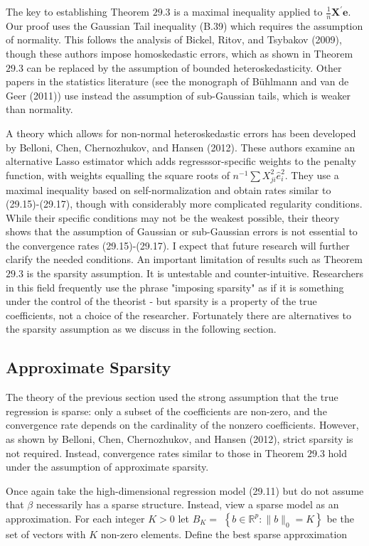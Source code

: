 \documentclass[10pt]{article}
\begin{document}
The key to establishing Theorem $29.3$ is a maximal inequality applied to $\frac{1}{n} \boldsymbol{X}^{\prime} \boldsymbol{e}$. Our proof uses the Gaussian Tail inequality (B.39) which requires the assumption of normality. This follows the analysis of Bickel, Ritov, and Tsybakov (2009), though these authors impose homoskedastic errors, which as shown in Theorem $29.3$ can be replaced by the assumption of bounded heteroskedasticity. Other papers in the statistics literature (see the monograph of Bühlmann and van de Geer (2011)) use instead the assumption of sub-Gaussian tails, which is weaker than normality.

A theory which allows for non-normal heteroskedastic errors has been developed by Belloni, Chen, Chernozhukov, and Hansen (2012). These authors examine an alternative Lasso estimator which adds regresssor-specific weights to the penalty function, with weights equalling the square roots of $n^{-1} \sum X_{j i}^{2} \widehat{e}_{i}^{2}$. They use a maximal inequality based on self-normalization and obtain rates similar to (29.15)-(29.17), though with considerably more complicated regularity conditions. While their specific conditions may not be the weakest possible, their theory shows that the assumption of Gaussian or sub-Gaussian errors is not essential to the convergence rates (29.15)-(29.17). I expect that future research will further clarify the needed conditions. An important limitation of results such as Theorem $29.3$ is the sparsity assumption. It is untestable and counter-intuitive. Researchers in this field frequently use the phrase "imposing sparsity" as if it is something under the control of the theorist - but sparsity is a property of the true coefficients, not a choice of the researcher. Fortunately there are alternatives to the sparsity assumption as we discuss in the following section.

\subsection{Approximate Sparsity}
The theory of the previous section used the strong assumption that the true regression is sparse: only a subset of the coefficients are non-zero, and the convergence rate depends on the cardinality of the nonzero coefficients. However, as shown by Belloni, Chen, Chernozhukov, and Hansen (2012), strict sparsity is not required. Instead, convergence rates similar to those in Theorem $29.3$ hold under the assumption of approximate sparsity.

Once again take the high-dimensional regression model (29.11) but do not assume that $\beta$ necessarily has a sparse structure. Instead, view a sparse model as an approximation. For each integer $K>0$ let $B_{K}=$ $\left\{b \in \mathbb{R}^{p}:\|b\|_{0}=K\right\}$ be the set of vectors with $K$ non-zero elements. Define the best sparse approximation
\end{document}
